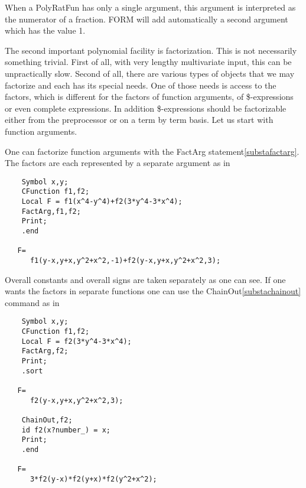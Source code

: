 \noindent When a PolyRatFun has only a single argument, this argument is 
interpreted as the numerator of a fraction. FORM will add automatically a 
second argument which has the value 1.

\noindent The second important polynomial facility is factorization. This 
is not necessarily something trivial. First of all, with very lengthy 
multivariate input, this can be unpractically slow. Second of all, there 
are various types of objects that we may factorize and each has its special 
needs. One of those needs is access to the factors, which is different for 
the factors of function arguments, of \$-expressions or even complete 
expressions. In addition \$-expressions should be factorizable either from 
the preprocessor or on a term by term basis. Let us start with function 
arguments.

\noindent One can factorize function arguments with the FactArg 
statement\ref{substafactarg}. The factors are each represented by a 
separate argument as in
\begin{verbatim}
    Symbol x,y;
    CFunction f1,f2;
    Local F = f1(x^4-y^4)+f2(3*y^4-3*x^4);
    FactArg,f1,f2;
    Print;
    .end

   F=
      f1(y-x,y+x,y^2+x^2,-1)+f2(y-x,y+x,y^2+x^2,3);
\end{verbatim}
Overall constants and overall signs are taken separately as one can see. If 
one wants the factors in separate functions one can use the 
ChainOut\ref{substachainout} command as in
\begin{verbatim}
    Symbol x,y;
    CFunction f1,f2;
    Local F = f2(3*y^4-3*x^4);
    FactArg,f2;
    Print;
    .sort

   F=
      f2(y-x,y+x,y^2+x^2,3);

    ChainOut,f2;
    id f2(x?number_) = x;
    Print;
    .end

   F=
      3*f2(y-x)*f2(y+x)*f2(y^2+x^2);
\end{verbatim}

